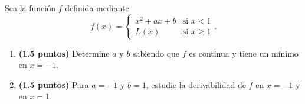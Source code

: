 
Sea la función $f$ definida mediante
\[
f(x)=\begin{cases}
x^2+ax+b&\text{si }x<1\\[0.4em]
L(x)&\text{si }x\geq1
\end{cases}.
\]
\begin{enumerate}[label=\alph*)]
\item \textbf{(1.5 puntos)} Determine $a$ y $b$ sabiendo que $f$ es continua y tiene un mínimo en $x=-1$.
\item \textbf{(1.5 puntos)} Para $a=-1$ y $b=1$, estudie la derivabilidad de $f$ en $x=-1$ y en $x=1$.
\end{enumerate}
